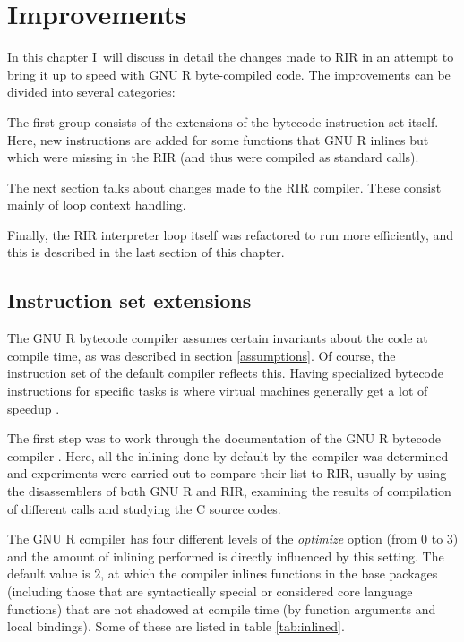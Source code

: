 \chapter{Improvements\label{improvements}}

In this chapter I~will discuss in detail the changes made to RIR in an attempt to bring it up to speed with GNU R byte-compiled code. The improvements can be divided into several categories:

The first group consists of the extensions of the bytecode instruction set itself. Here, new instructions are added for some functions that GNU R inlines but which were missing in the RIR (and thus were compiled as standard calls).

The next section talks about changes made to the RIR compiler. These consist mainly of loop context handling.

Finally, the RIR interpreter loop itself was refactored to run more efficiently, and this is described in the last section of this chapter.


\section{Instruction set extensions}

The GNU R bytecode compiler assumes certain invariants about the code at compile time, as was described in section \ref{assumptions}. Of course, the instruction set of the default compiler reflects this. Having specialized bytecode instructions for specific tasks is where virtual machines generally get a lot of speedup \autocite{fastr}.

The first step was to work through the documentation of the GNU R bytecode compiler \autocite{compiler}. Here, all the inlining done by default by the compiler was determined and experiments were carried out to compare their list to RIR, usually by using the disassemblers of both GNU R and RIR, examining the results of compilation of different calls and studying the C source codes.

The GNU R compiler has four different levels of the \emph{optimize} option (from 0 to 3) and the amount of inlining performed is directly influenced by this setting. The default value is 2, at which the compiler inlines functions in the base packages (including those that are syntactically special or considered core language functions) that are not shadowed at compile time (by function arguments and local bindings). Some of these are listed in table \ref{tab:inlined}.

